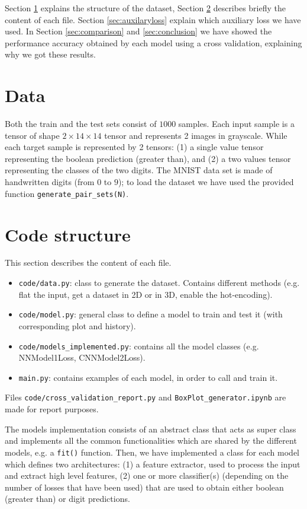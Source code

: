\documentclass[journal, a4paper]{IEEEtran}
\begin{document}
Section \ref{sec:data} explains the structure of the dataset, Section \ref{sec:codestruc} describes briefly the content of each file. Section \ref{sec:auxilaryloss} explain which auxiliary loss we have used. In Section \ref{sec:comparison} and \ref{sec:conclusion} we have showed the performance accuracy obtained by each model using a cross validation, explaining why we got these results.


\section{Data}
\label{sec:data}
Both the train and the test sets consist of $1000$ samples. Each input sample is a tensor of shape $2\times14\times14$ tensor and represents 2 images in grayscale. While each target sample is represented by 2 tensors: (1) a single value tensor representing the boolean prediction (greater than), and (2) a two values tensor representing the classes of the two digits. The MNIST data set is made of handwritten digits (from $0$ to $9$); to load the dataset we have used the provided function \texttt{generate\_pair\_sets(N)}.

\section{Code structure}
\label{sec:codestruc}
This section describes the content of each file.
\begin{itemize}
    \item \texttt{code/data.py}: class to generate the dataset. Contains different methods (e.g. flat the input, get a dataset in 2D or in 3D, enable the hot-encoding).
    \item \texttt{code/model.py}: general class to define a model to train and test it (with corresponding plot and history).
    \item \texttt{code/models\_implemented.py}: contains all the model classes (e.g. NNModel1Loss, CNNModel2Loss).
    \item \texttt{main.py}: contains examples of each model, in order to call and train it.
\end{itemize}
Files \texttt{code/cross\_validation\_report.py} and \texttt{BoxPlot\_generator.ipynb} are made for report purposes.

The models implementation consists of an abstract class that acts as super class and implements all the common functionalities which are shared by the different models, e.g. a \texttt{fit()} function. Then, we have implemented a class for each model which defines two architectures: (1) a feature extractor, used to process the input and extract high level features, (2) one or more classifier(s) (depending on the number of losses that have been used) that are used to obtain either boolean (greater than) or digit predictions.
\end{document}
